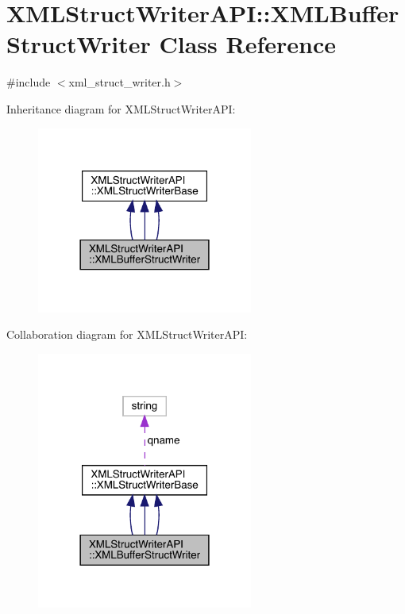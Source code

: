 \hypertarget{classXMLStructWriterAPI_1_1XMLBufferStructWriter}{}\section{X\+M\+L\+Struct\+Writer\+A\+PI\+:\+:X\+M\+L\+Buffer\+Struct\+Writer Class Reference}
\label{classXMLStructWriterAPI_1_1XMLBufferStructWriter}


{\ttfamily \#include $<$xml\+\_\+struct\+\_\+writer.\+h$>$}



Inheritance diagram for X\+M\+L\+Struct\+Writer\+A\+PI\+:
\nopagebreak
\begin{figure}[H]
\begin{center}
\leavevmode
\includegraphics[width=201pt]{dc/dcd/classXMLStructWriterAPI_1_1XMLBufferStructWriter__inherit__graph}
\end{center}
\end{figure}


Collaboration diagram for X\+M\+L\+Struct\+Writer\+A\+PI\+:
\nopagebreak
\begin{figure}[H]
\begin{center}
\leavevmode
\includegraphics[width=201pt]{d0/d60/classXMLStructWriterAPI_1_1XMLBufferStructWriter__coll__graph}
\end{center}
\end{figure}
